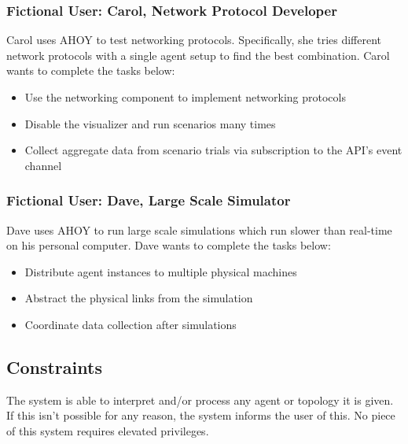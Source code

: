 \documentclass[titlepage]{article}
\begin{document}
\subsubsection{Fictional User: Carol, Network Protocol Developer%
  \label{bob}%
}

Carol uses AHOY to test networking protocols.  Specifically, she tries different network protocols with a single agent
setup to find the best combination.  Carol wants to complete the tasks below:

\begin{itemize}
    \item Use the networking component to implement networking protocols
    \item Disable the visualizer and run scenarios many times
    \item Collect aggregate data from scenario trials via subscription to the API's event channel
\end{itemize}

\subsubsection{Fictional User: Dave, Large Scale Simulator%
  \label{bob}%
}

Dave uses AHOY to run large scale simulations which run slower than real-time on his personal computer.  Dave wants to
complete the tasks below:

\begin{itemize}
    \item Distribute agent instances to multiple physical machines
    \item Abstract the physical links from the simulation
    \item Coordinate data collection after simulations
\end{itemize}

\subsection{Constraints%
  \label{constraints}%
}

The system is able to interpret and/or process any agent or topology it is given.  If this isn't possible for any reason, the system informs the user of this. No piece of this system requires elevated privileges.

\end{document}
